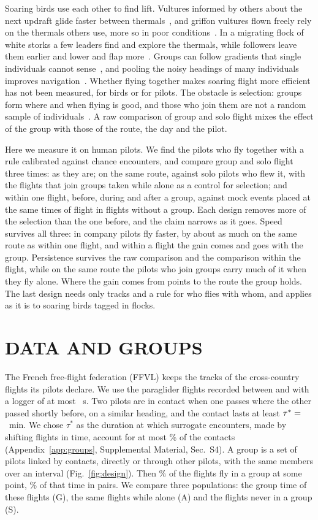 \documentclass[aps,prl,twocolumn,superscriptaddress,nofootinbib]{revtex4-2}
\let\tauStar\relax
\newcommand{\SM}[1]{Supplemental Material, Sec.~S#1}
\begin{document}
Soaring birds use each other to find lift. Vultures informed by others about the next updraft
glide faster between thermals~\cite{Williams2018}, and griffon vultures flown freely rely on the
thermals others use, more so in poor conditions~\cite{Sassi2024}. In a migrating flock of white
storks a few leaders find and explore the thermals, while followers leave them earlier and lower
and flap more~\cite{Flack2018}. Groups can follow gradients that single individuals cannot
sense~\cite{Berdahl2013}, and pooling the noisy headings of many individuals improves
navigation~\cite{Simons2004,Codling2007,Berdahl2018}. Whether flying together makes soaring flight
more efficient has not been measured, for birds or for pilots. The obstacle is selection: groups
form where and when flying is good, and those who join them are not a random sample of
individuals~\cite{Manski1993}. A raw comparison of group and solo flight mixes the effect of the
group with those of the route, the day and the pilot.

Here we measure it on human pilots. We find the pilots who fly together with a rule calibrated
against chance encounters, and compare group and solo flight three times: as they are; on the same
route, against solo pilots who flew it, with the flights that join groups taken while alone as a
control for selection; and within one flight, before, during and after a group, against mock
events placed at the same times of flight in flights without a group. Each design removes more of
the selection than the one before, and the claim narrows as it goes. Speed survives all three: in
company pilots fly faster, by about as much on the same route as within one flight, and within a
flight the gain comes and goes with the group. Persistence survives the raw comparison and the
comparison within the flight, while on the same route the pilots who join groups carry much of it
when they fly alone. Where the gain comes from points to the route the group holds. The last
design needs only tracks and a rule for who flies with whom, and applies as it is to soaring birds
tagged in flocks.

\section*{DATA AND GROUPS}

The French free-flight federation (FFVL) keeps the tracks of the cross-country flights its pilots
declare. We use the \LtFlights{} paraglider flights recorded between \LtFirstYear{} and
\LtLastYear{} with a logger of at most \LtLoggerMax~s. Two pilots are in contact when one passes
where the other passed shortly before, on a similar heading, and the contact lasts at least
$\tau^* = \tauStar$~min. We chose $\tau^*$ as the duration at which surrogate encounters, made by
shifting flights in time, account for at most \LtNullShare\% of the contacts
(Appendix~\ref{app:groups}, \SM{4}). A group is a set of pilots linked by contacts, directly or
through other pilots, with the same members over an interval (Fig.~\ref{fig:design}). Then
\LtGroupShare\% of the flights fly in a group at some point, \LtPairShare\% of that time in pairs.
We compare three populations: the group time of these flights (G), the same flights while alone (A)
and the flights never in a group (S).
\end{document}
